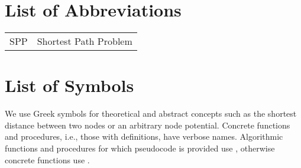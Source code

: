 

\appendix

{}	%
{}	%

\section{List of Abbreviations}
\label{app:abb}

\begin{tabular}{cp{}}
	SPP & Shortest Path Problem \\
\end{tabular}



\section{List of Symbols}
\label{app:symbols}

We use Greek symbols for theoretical and abstract concepts such as the shortest distance between two nodes or an arbitrary node potential. Concrete functions and procedures, i.e., those with definitions, have verbose names. Algorithmic functions and procedures for which pseudocode is provided use , otherwise concrete functions use .

